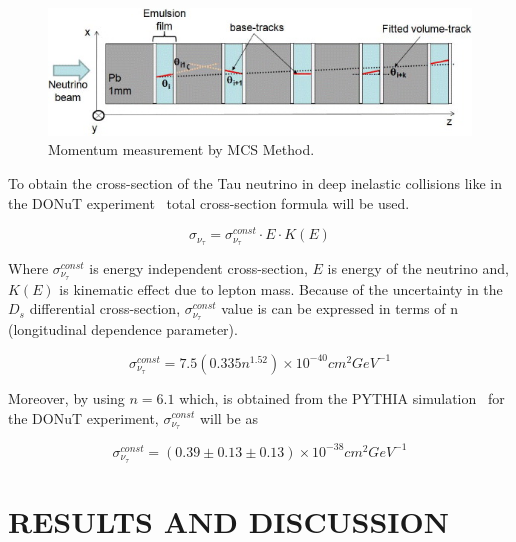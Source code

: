 \documentclass[12pt]{report}
\begin{document}
\begin{figure}[htp]
\centering
\includegraphics[width = \linewidth]{MCS.jpg}
\caption{Momentum measurement by MCS Method.~\cite[p.~6]{Agafonova_2012}}
\label{fig:MCS}
\end{figure}

To obtain the cross-section of the Tau neutrino in deep inelastic collisions like in the DONuT experiment~\cite{kodama_ushida_andreopoulos_saoulidou_tzanakos_yager_baller_boehnlein_freeman_lundberg_2016} total cross-section formula will be used. 

\begin{equation}
\sigma_{\nu_\tau} = \sigma^{const}_{\nu_\tau} \cdot E \cdot K(E)
\end{equation}

Where $\sigma^{const}_{\nu_\tau}$ is energy independent cross-section, $E$ is energy of the neutrino and, $K(E)$ is kinematic effect due to lepton mass. Because of the uncertainty in the $D_s$ differential cross-section, $\sigma^{const}_{\nu_\tau}$ value is can be expressed in terms of n (longitudinal dependence parameter).

\begin{equation}
\sigma^{const}_{\nu_\tau} = 7.5(0.335n^{1.52}) \times 10^{-40} cm^{2} GeV^{-1}
\end{equation}

Moreover, by using $n = 6.1$ which, is obtained from the PYTHIA simulation~\cite{sjostrand_mrenna_skands_2007} for the DONuT experiment, $\sigma^{const}_{\nu_\tau}$ will be as

\begin{equation}
\sigma^{const}_{\nu_\tau} = (0.39 \pm 0.13 \pm 0.13) \times 10^{-38} cm^{2} GeV^{-1}
\end{equation}

\newpage

\section{RESULTS AND DISCUSSION}
\end{document}
